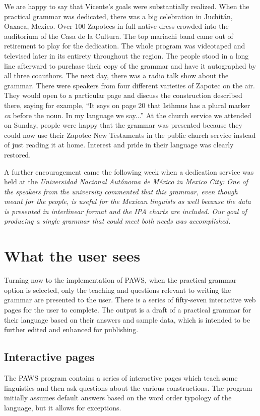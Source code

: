 We are happy to say that Vicente's goals were substantially realized. When the practical grammar was dedicated, there was a big celebration in Juchitán, Oaxaca, Mexico. Over 100 Zapotecs in full native dress crowded into the auditorium of the Casa de la Cultura. The top mariachi band came out of retirement to play for the dedication. The whole program was videotaped and televised later in its entirety throughout the region. The people stood in a long line afterward to purchase their copy of the grammar and have it autographed by all three coauthors. The next day, there was a radio talk show about the grammar. There were speakers from four different varieties of Zapotec on the air. They would open to a particular page and discuss the construction described there, saying for example, ``It says on page 20 that Isthmus has a plural marker {\textit{ca}} before the noun. In my language we say...'' At the church service we attended on Sunday, people were happy that the grammar was presented because they could now use their Zapotec New Testaments in the public church service instead of just reading it at home. Interest and pride in their language was clearly restored.

A further encouragement came the following week when a dedication service was held at the \em Universidad Nacional Autónoma de México \em in Mexico City: One of the speakers from the university commented that this grammar, even though meant for the people, is useful for the Mexican linguists as well because the data is presented in interlinear format and the IPA charts are included. Our goal of producing a single grammar that could meet both needs was accomplished.


\section{What the user sees}\label{sInterface}
Turning now to the implementation of {PAWS}, when the practical grammar option is selected, only the teaching and questions relevant to writing the grammar are presented to the user. There is a series of fifty-seven interactive web pages for the user to complete. The output is a draft of a practical grammar for their language based on their answers and sample data, which is intended to be further edited and enhanced for publishing.


\subsection{Interactive pages}\label{sPages}
The {PAWS} program contains a series of interactive pages which teach some linguistics and then ask questions about the various constructions. The program initially assumes default answers based on the word order typology of the language, but it allows for exceptions.

